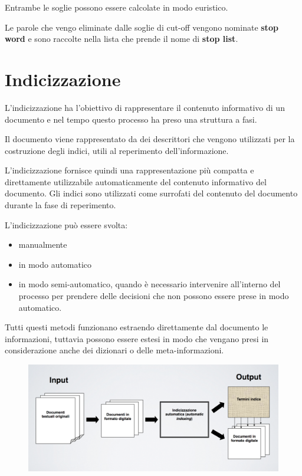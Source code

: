 Entrambe le soglie possono essere calcolate in modo euristico.

Le parole che vengo eliminate dalle soglie di cut-off vengono nominate \textbf{stop word} e sono raccolte nella lista che prende il nome di \textbf{stop list}.

\section{Indicizzazione}

L'indicizzazione ha l'obiettivo di rappresentare il contenuto informativo di un documento e nel tempo questo processo ha preso una struttura a fasi.

Il documento viene rappresentato da dei descrittori che vengono utilizzati per la costruzione degli indici, utili al reperimento dell'informazione.

L'indicizzazione fornisce quindi una rappresentazione più compatta e direttamente utilizzabile automaticamente del contenuto informativo del documento. Gli indici sono utilizzati come surrofati del contenuto del documento durante la fase di reperimento.

L'indicizzazione può essere svolta:

\begin{itemize}
	\item manualmente
	\item in modo automatico
	\item in modo semi-automatico, quando è necessario intervenire all'interno del processo per prendere delle decisioni che non possono essere prese in modo automatico.
\end{itemize}

Tutti questi metodi funzionano estraendo direttamente dal documento le informazioni, tuttavia possono essere estesi in modo che vengano presi in considerazione anche dei dizionari o delle meta-informazioni.

\begin{figure}[htbp]
	\centering
	\includegraphics[width=0.7\linewidth]{images/l3-indicizzazione}
\end{figure}

